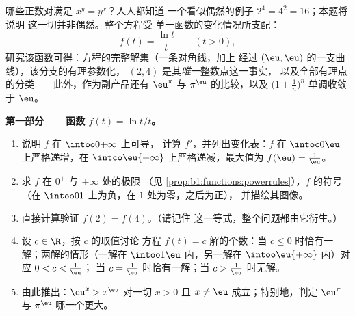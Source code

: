 \begin{problem}\label{pb:b1:functions:1}
哪些正数对满足 $x^y = y^x$？人人都知道
一个看似偶然的例子 $2^4 = 4^2 = 16$；本题将说明
这一切并非偶然。整个方程受
单一函数的变化情况所支配：
\[
f(t) = \frac{\ln t}{t} \qquad (t > 0),
\]
研究该函数可得：方程的完整解集（一条对角线，加上
经过 $(\eu, \eu)$ 的一支曲线），该分支的有理参数化，
$(2, 4)$ 是其\emph{唯一}整数点这一事实，
以及全部有理点的分类——此外，作为副产品还有
$\eu^\pi$ 与 $\pi^\eu$ 的比较，以及
$\bigl(1 + \frac1n\bigr)^n$ 单调收敛于 $\eu$。

\medskip
\noindent\textbf{第一部分——函数 $f(t) = \ln t / t$。}
\begin{enumerate}
  \item 说明 $f$ 在 $\intoo0{+\infty}$ 上可导，
        计算 $f'$，并列出变化表：$f$
        在 $\intoc0\eu$ 上严格递增，在
        $\intco\eu{+\infty}$ 上严格递减，最大值为 $f(\eu) = \frac1\eu$。
  \item 求 $f$ 在 $0^+$ 与 $+\infty$ 处的极限
        （见 \cref{prop:b1:functions:powerrules}），$f$ 的符号
        （在 $\intoo01$ 上为负，在 $1$ 处为零，之后为正），
        并描绘其图像。
  \item 直接计算验证 $f(2) = f(4)$。（请记住
        这一等式，整个问题都由它衍生。）
  \item 设 $c \in \R$，按 $c$ 的取值讨论
        方程 $f(t) = c$ 解的个数：当 $c \leq
        0$ 时恰有一解；两解的情形（一解在 $\intoo1\eu$ 内，另一解在
        $\intoo\eu{+\infty}$ 内）对应 $0 < c < \frac1\eu$；
        当 $c = \frac1\eu$ 时恰有一解；当 $c > \frac1\eu$ 时无解。
  \item 由此推出：$\eu^x > x^\eu$ 对一切 $x > 0$ 且 $x \neq
        \eu$ 成立；特别地，判定 $\eu^\pi$ 与
        $\pi^\eu$ 哪一个更大。
\end{enumerate}


\end{problem}
